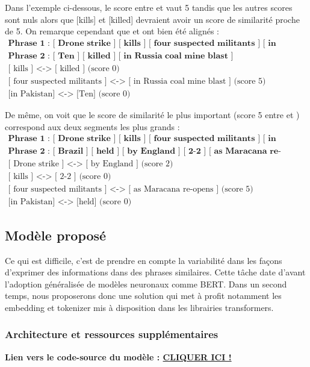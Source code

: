 \documentclass[a4paper, twoside, 11pt]{article}
\begin{document}
Dans l'exemple ci-dessous, le score entre  \fg{} et   \fg{} vaut 5 tandis que les autres scores sont nuls alors que [kills] et [killed] devraient avoir un score de similarité proche de 5. On remarque cependant que \og [ kills ] \fg{} et \og [ killed ] \fg{} ont bien été alignés :
\begin{eqnarray*}
\textbf{Phrase 1 : [ Drone strike ] [ kills ] [ four suspected militants ] [ in Pakistan ]}\\
\textbf{Phrase 2 : [ Ten ] [ killed ] [ in Russia coal mine blast ]}\\
\textrm{[ kills ] <-> [ killed ] (score 0)}\\
\textrm{[ four suspected militants ] <-> [ in Russia coal mine blast ] (score 5)}\\
\textrm{[in Pakistan] <-> [Ten] (score 0)}
\end{eqnarray*}


De même, on voit que le score de similarité le plus important (score 5 entre  \fg{} et \fg{}) correspond aux deux segments les plus grands :
\begin{eqnarray*}
\textbf{Phrase 1 : [ Drone strike ] [ kills ] [ four suspected militants ] [ in Pakistan ]}\\
\textbf{Phrase 2 : [ Brazil ] [ held ] [ by England ] [ 2-2 ] [ as Maracana re-opens ]}\\
\textrm{[ Drone strike ] <-> [ by England ] (score 2)}\\
\textrm{[ kills ] <-> [ 2-2 ] (score 0)}\\
\textrm{[ four suspected militants ] <-> [ as Maracana re-opens ] (score 5)}\\
\textrm{[in Pakistan] <-> [held] (score 0)}
\end{eqnarray*}

    \subsection{Modèle proposé}
     Ce qui est difficile, c’est de prendre en compte la variabilité dans les façons d’exprimer des informations dans des phrases similaires. Cette tâche date d’avant l’adoption généralisée de modèles neuronaux comme BERT. Dans un second temps, nous proposerons donc une solution qui met à profit notamment les embedding et tokenizer mis à disposition dans les librairies transformers.

 \subsubsection{Architecture et ressources supplémentaires}
 \textbf{Lien vers le code-source du modèle : \href{https://github.com/timfronteau/Semantic_chunk_identification}{CLIQUER ICI !}} \hfill \linebreak
\end{document}
